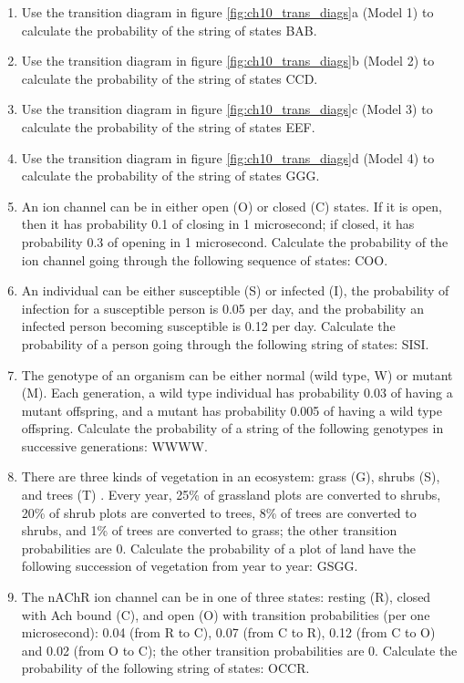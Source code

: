 \documentclass[
]{book}
\theoremstyle{definition}
\theoremstyle{definition}
\theoremstyle{definition}
\theoremstyle{remark}
\begin{document}
\begin{enumerate}
\def\labelenumi{\arabic{enumi}.}
\item
  Use the transition diagram in figure \ref{fig:ch10_trans_diags}a (Model 1) to calculate the probability of the string of states BAB.
\item
  Use the transition diagram in figure \ref{fig:ch10_trans_diags}b (Model 2) to calculate the probability of the string of states CCD.
\item
  Use the transition diagram in figure \ref{fig:ch10_trans_diags}c (Model 3) to calculate the probability of the string of states EEF.
\item
  Use the transition diagram in figure \ref{fig:ch10_trans_diags}d (Model 4) to calculate the probability of the string of states GGG.
\item
  An ion channel can be in either open (O) or closed (C) states. If it is open, then it has probability 0.1 of closing in 1 microsecond; if closed, it has probability 0.3 of opening in 1 microsecond. Calculate the probability of the ion channel going through the following sequence of states: COO.
\item
  An individual can be either susceptible (S) or infected (I), the probability of infection for a susceptible person is 0.05 per day, and the probability an infected person becoming susceptible is 0.12 per day. Calculate the probability of a person going through the following string of states: SISI.
\item
  The genotype of an organism can be either normal (wild type, W) or mutant (M). Each generation, a wild type individual has probability 0.03 of having a mutant offspring, and a mutant has probability 0.005 of having a wild type offspring. Calculate the probability of a string of the following genotypes in successive generations: WWWW.
\item
  There are three kinds of vegetation in an ecosystem: grass (G), shrubs (S), and trees (T) \citep{bodine_mathematics_2014}. Every year, 25\% of grassland plots are converted to shrubs, 20\% of shrub plots are converted to trees, 8\% of trees are converted to shrubs, and 1\% of trees are converted to grass; the other transition probabilities are 0. Calculate the probability of a plot of land have the following succession of vegetation from year to year: GSGG.
\item
  The nAChR ion channel can be in one of three states: resting (R), closed with Ach bound (C), and open (O) with transition probabilities (per one microsecond): 0.04 (from R to C), 0.07 (from C to R), 0.12 (from C to O) and 0.02 (from O to C); the other transition probabilities are 0. Calculate the probability of the following string of states: OCCR.

\end{enumerate}
\end{document}
